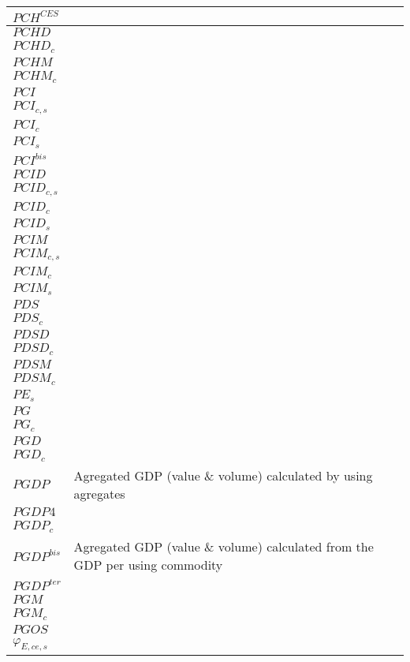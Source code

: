 \documentclass[12pt]{article}
\numberwithin{equation}{section}
\begin{document}
\begin{longtable}{@{}p{4cm}p{9cm}@{}}
$PCH^{CES}$ &  \\
 \midrule 
$PCHD$ &  \\
 \midrule 
$PCHD_{c}$ &  \\
 \midrule 
$PCHM$ &  \\
 \midrule 
$PCHM_{c}$ &  \\
 \midrule 
$PCI$ &  \\
 \midrule 
$PCI_{c, s}$ &  \\
 \midrule 
$PCI_{c}$ &  \\
 \midrule 
$PCI_{s}$ &  \\
 \midrule 
$PCI^{bis}$ &  \\
 \midrule 
$PCID$ &  \\
 \midrule 
$PCID_{c, s}$ &  \\
 \midrule 
$PCID_{c}$ &  \\
 \midrule 
$PCID_{s}$ &  \\
 \midrule 
$PCIM$ &  \\
 \midrule 
$PCIM_{c, s}$ &  \\
 \midrule 
$PCIM_{c}$ &  \\
 \midrule 
$PCIM_{s}$ &  \\
 \midrule 
$PDS$ &  \\
 \midrule 
$PDS_{c}$ &  \\
 \midrule 
$PDSD$ &  \\
 \midrule 
$PDSD_{c}$ &  \\
 \midrule 
$PDSM$ &  \\
 \midrule 
$PDSM_{c}$ &  \\
 \midrule 
$PE_{s}$ &  \\
 \midrule 
$PG$ &  \\
 \midrule 
$PG_{c}$ &  \\
 \midrule 
$PGD$ &  \\
 \midrule 
$PGD_{c}$ &  \\
 \midrule 
$PGDP$ & Agregated GDP (value \& volume) calculated by using agregates \\
 \midrule 
$PGDP4$ &  \\
 \midrule 
$PGDP_{c}$ &  \\
 \midrule 
$PGDP^{bis}$ & Agregated GDP (value \& volume) calculated from the GDP per using commodity \\
 \midrule 
$PGDP^{ter}$ &  \\
 \midrule 
$PGM$ &  \\
 \midrule 
$PGM_{c}$ &  \\
 \midrule 
$PGOS$ &  \\
 \midrule 
$\varphi_{E, ce, s}$ &  \\

\end{longtable}
\end{document}
